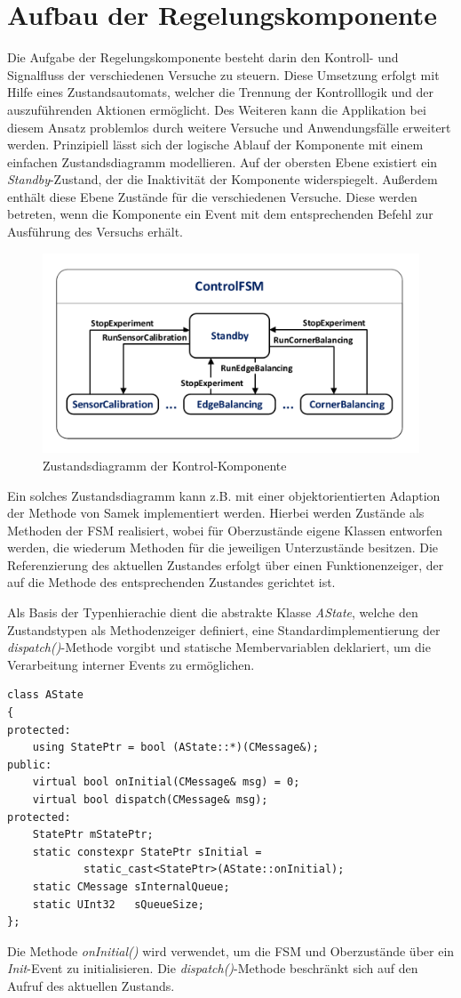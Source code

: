 \section{Aufbau der Regelungskomponente}\label{section_controlcomp}
Die Aufgabe der Regelungskomponente besteht darin den Kontroll- und Signalfluss der verschiedenen Versuche zu steuern. Diese Umsetzung erfolgt mit Hilfe eines Zustandsautomats, welcher die Trennung der Kontrolllogik und der auszuführenden Aktionen ermöglicht. Des Weiteren kann die Applikation bei diesem Ansatz problemlos durch weitere Versuche und Anwendungsfälle erweitert werden. 
Prinzipiell lässt sich der logische Ablauf der Komponente mit einem einfachen Zustandsdiagramm modellieren. Auf der obersten Ebene existiert ein \textit{Standby}-Zustand, der die Inaktivität der Komponente widerspiegelt. Außerdem enthält diese Ebene Zustände für die verschiedenen Versuche. Diese werden betreten, wenn die Komponente ein Event mit dem entsprechenden Befehl zur Ausführung des Versuchs erhält.
\begin{figure}[h!]
\centering
\includegraphics[width=0.7\linewidth]{img/SW_2_ControlComp_SC.pdf}
\caption{Zustandsdiagramm der Kontrol-Komponente}
\end{figure}
Ein solches Zustandsdiagramm kann z.B. mit einer objektorientierten Adaption der Methode von Samek \cite[S. 246 ff.]{Wietzke1} implementiert werden. Hierbei werden Zustände als Methoden der FSM realisiert, wobei für Oberzustände eigene Klassen entworfen werden, die wiederum Methoden für die jeweiligen Unterzustände besitzen. Die Referenzierung des aktuellen Zustandes erfolgt über einen Funktionenzeiger, der auf die Methode des entsprechenden Zustandes gerichtet ist. 

Als Basis der Typenhierachie dient die abstrakte Klasse \textit{AState}, welche den Zustandstypen als Methodenzeiger definiert, eine Standardimplementierung der \textit{dispatch()}-Methode vorgibt und statische Membervariablen deklariert, um die Verarbeitung interner Events zu ermöglichen.
\begin{lstlisting}[caption={Abstrakte Basisklasse für die Zustände},captionpos=b]
class AState
{
protected:
	using StatePtr = bool (AState::*)(CMessage&);
public:
	virtual bool onInitial(CMessage& msg) = 0;
	virtual bool dispatch(CMessage& msg);
protected:
	StatePtr mStatePtr;
	static constexpr StatePtr sInitial = 
			static_cast<StatePtr>(AState::onInitial);
	static CMessage sInternalQueue;
	static UInt32   sQueueSize;
};
\end{lstlisting}
Die Methode \textit{onInitial()} wird verwendet, um die FSM und Oberzustände über ein \textit{Init}-Event zu initialisieren. Die \textit{dispatch()}-Methode beschränkt sich auf den Aufruf des aktuellen Zustands.

